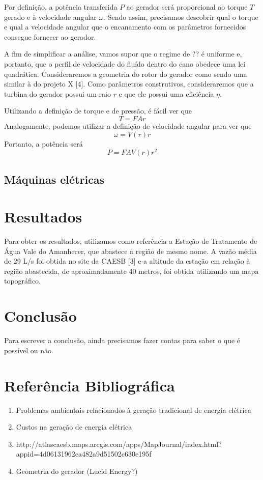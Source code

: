 \documentclass[12pt, a4paper, twoside]{article}
\begin{document}

Por definição, a potência transferida $P$ ao gerador será proporcional ao torque $T$ gerado e à velocidade angular $\omega$. Sendo assim, precisamos descobrir qual o torque e qual a velocidade angular que o encanamento com os parâmetros fornecidos consegue fornecer ao gerador.

A fim de simplificar a análise, vamos supor que o regime de ?? é uniforme e, portanto, que o perfil de velocidade do fluído dentro do cano obedece uma lei quadrática. Consideraremos a geometria do rotor do gerador como sendo uma similar à do projeto X [4]. Como parâmetros construtivos, consideraremos que a turbina do gerador possui um raio $ r $ e que ele possui uma eficiência $ \eta $.

Utilizando a definição de torque e de pressão, é fácil ver que $$ T = F A r $$ Analogamente, podemos utilizar a definição de velocidade angular para ver que $$ \omega = V(r) r $$ Portanto, a potência será $$ P = F A V(r) r^2 $$

\subsection{Máquinas elétricas}


\section{Resultados}

Para obter os resultados, utilizamos como referência a Estação de Tratamento de Água Vale do Amanhecer, que abastece a região de mesmo nome. A vazão média de 29 L/s foi obtida no site da CAESB [3] e a altitude da estação em relação à região abastecida, de aproximadamente 40 metros, foi obtida utilizando um mapa topográfico.



\section{Conclusão}

Para escrever a conclusão, ainda precisamos fazer contas para saber o que é
possível ou não.

\section{Referência Bibliográfica}

\begin{enumerate}
    \item Problemas ambientais relacionados à geração tradicional de energia
    elétrica
    \item Custos na geração de energia elétrica
    \item http://atlascaesb.maps.arcgis.com/apps/MapJournal/index.html?appid=4d06131962ca482a9d51502c630e195f
    \item Geometria do gerador (Lucid Energy?)
\end{enumerate}
\end{document}
